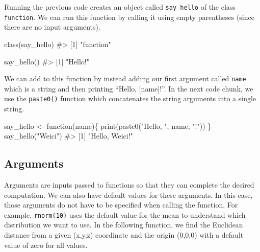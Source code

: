 \documentclass[
  letterpaper,
]{latex/krantz}
\makeatletter
\newenvironment{Shaded}{\begin{snugshade}}{\end{snugshade}}
\newcommand{\CommentTok}[1]{\textcolor[rgb]{0.37,0.37,0.37}{#1}}
\newcommand{\ControlFlowTok}[1]{\textcolor[rgb]{0.00,0.23,0.31}{#1}}
\newcommand{\FunctionTok}[1]{\textcolor[rgb]{0.28,0.35,0.67}{#1}}
\newcommand{\NormalTok}[1]{\textcolor[rgb]{0.00,0.23,0.31}{#1}}
\newcommand{\OtherTok}[1]{\textcolor[rgb]{0.00,0.23,0.31}{#1}}
\newcommand{\StringTok}[1]{\textcolor[rgb]{0.13,0.47,0.30}{#1}}
\newenvironment{kframe}{%
\medskip{}
\setlength{\fboxsep}{.8em}
 \def\at@end@of@kframe{}%
 \ifinner\ifhmode%
  \def\at@end@of@kframe{\end{minipage}}%
  \begin{minipage}{\columnwidth}%
 \fi\fi%
 \def\FrameCommand##1{\hskip\@totalleftmargin \hskip-\fboxsep
 \colorbox{shadecolor}{##1}\hskip-\fboxsep
     \hskip-\linewidth \hskip-\@totalleftmargin \hskip\columnwidth}%
 \MakeFramed {\advance\hsize-\width
   \@totalleftmargin\z@ \linewidth\hsize
   \@setminipage}}%
 {\par\unskip\endMakeFramed%
 \at@end@of@kframe}
\renewenvironment{Shaded}{\begin{kframe}}{\end{kframe}}
\makeatother
\begin{document}
Running the previous code creates an object called \texttt{say\_hello}
of the class \texttt{function}. We can run this function by calling it
using empty parentheses (since there are no input arguments).

\begin{Shaded}
\begin{Highlighting}[]
\FunctionTok{class}\NormalTok{(say\_hello)}
\CommentTok{\#\textgreater{} [1] "function"}
\end{Highlighting}
\end{Shaded}

\begin{Shaded}
\begin{Highlighting}[]
\FunctionTok{say\_hello}\NormalTok{()}
\CommentTok{\#\textgreater{} [1] "Hello!"}
\end{Highlighting}
\end{Shaded}

We can add to this function by instead adding our first argument called
\texttt{name} which is a string and then printing ``Hello,
{[}name{]}!''. In the next code chunk, we use the
\texttt{paste0()} function
which concatenates the string arguments into a single string.

\begin{Shaded}
\begin{Highlighting}[]
\NormalTok{say\_hello }\OtherTok{\textless{}{-}} \ControlFlowTok{function}\NormalTok{(name)\{}
  \FunctionTok{print}\NormalTok{(}\FunctionTok{paste0}\NormalTok{(}\StringTok{"Hello, "}\NormalTok{, name, }\StringTok{"!"}\NormalTok{))}
\NormalTok{\}}
\FunctionTok{say\_hello}\NormalTok{(}\StringTok{"Weici"}\NormalTok{)}
\CommentTok{\#\textgreater{} [1] "Hello, Weici!"}
\end{Highlighting}
\end{Shaded}

\subsection{\texorpdfstring{Arguments
}{Arguments }}\label{arguments}

Arguments are inputs passed to functions so that they can complete the
desired computation. We can also have default values for these
arguments. In this case, those arguments
do not have to be specified when calling the function. For example,
\texttt{rnorm(10)} uses the default value for the mean to understand
which distribution we want to use. In the following function, we find
the Euclidean distance from a given (x,y,z) coordinate and the origin
(0,0,0) with a default value of zero for all values.
\end{document}
